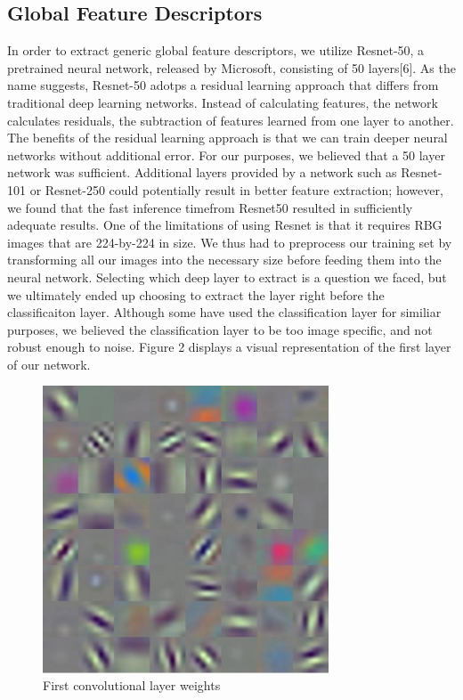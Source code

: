 \documentclass{article}
\begin{document}
\subsection{Global Feature Descriptors}
\label{ssec:subhead}
\hspace{\parindent} In order to extract generic global feature descriptors, we utilize Resnet-50, a pretrained neural network, released by Microsoft, consisting of 50 layers[6]. As the name suggests, Resnet-50 adotps a residual learning approach that differs from traditional deep learning networks. Instead of calculating features, the network calculates residuals, the subtraction of features learned from one layer to another. The benefits of the residual learning approach is that we can train deeper neural networks without additional error. For our purposes, we believed that a 50 layer network was sufficient. Additional layers provided by a network such as Resnet-101 or Resnet-250 could potentially result in better feature extraction; however, we found that the fast inference timefrom Resnet50 resulted in sufficiently adequate results.\newline
\indent
One of the limitations of using Resnet is that it requires RBG images that are 224-by-224 in size. We thus had to preprocess our training set by transforming all our images into the necessary size before feeding them into the neural network. Selecting which deep layer to extract is a question we faced, but we ultimately ended up choosing to extract the layer right before the classificaiton layer. Although some have used the classification layer for similiar purposes, we believed the classification layer to be too image specific, and not robust enough to noise. Figure 2 displays a visual representation of the first layer of our network.
\newline
\begin{figure}[htb]

\begin{minipage}[b]{1.0\linewidth}
  \centering
  \centerline{\includegraphics[width=8.5cm]{firstLayer}}

\end{minipage}
%

%
\caption{First convolutional layer weights}
\label{fig:res}
%
\end{figure}
\end{document}
